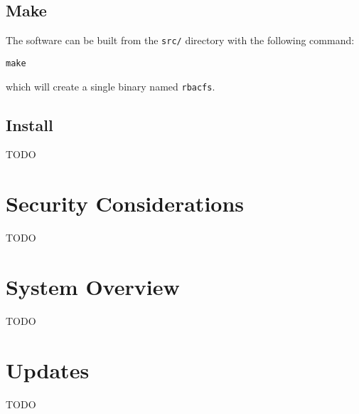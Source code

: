 \documentclass[11pt,oneside,letterpaper,twocolumn]{article}
\begin{document}
\subsection{Make}

The software can be built from the {\tt src/} directory with the following
command:
\begin{lstlisting}
make
\end{lstlisting}
which will create a single binary named {\tt rbacfs}.

\subsection{Install}

TODO

\section{Security Considerations}

TODO

\section{System Overview}

TODO

\section{Updates}

TODO
\end{document}
